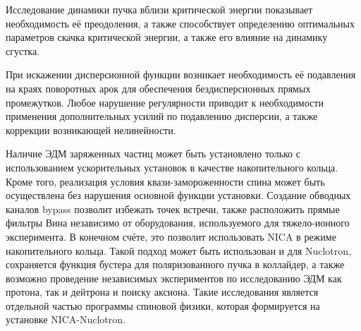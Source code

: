 \par Исследование динамики пучка вблизи критической энергии показывает необходимость её преодоления, а также  способствует определению оптимальных параметров скачка критической энергии, а также его влияние на динамику сгустка.

\par При искажении дисперсионной функции возникает необходимость её подавления на краях поворотных арок для обеспечения бездисперсионных прямых промежутков. Любое нарушение регулярности приводит к необходимости применения дополнительных усилий по подавлению дисперсии, а также коррекции возникающей нелинейности.

\par Наличие ЭДМ заряженных частиц может быть установлено только с использованием ускорительных установок в качестве накопительного кольца. Кроме того, реализация условия квази-замороженности спина может быть осуществлена без нарушения основной функции установки. Создание обводных каналов bypass позволит избежать точек встречи, также расположить прямые фильтры Вина независимо от оборудования, используемого для тяжело-ионного эксперимента. В конечном счёте, это позволит использовать NICA в режиме накопительного кольца. Такой подход может быть использован и для Nuclotron, сохраняется функция бустера для поляризованного пучка в коллайдер, а также возможно проведение независимых экспериментов по исследованию ЭДМ как протона, так и дейтрона и поиску аксиона. Такие исследования является отдельной частью программы спиновой физики, которая формируется на установке NICA-Nuclotron.

